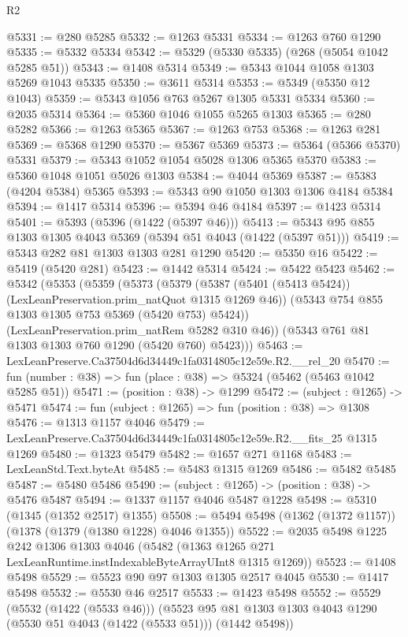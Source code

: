 \begin{lexlean}{R2}
\begin{coremodule}
@5331 := @280 @5285
@5332 := @1263 @5331
@5334 := @1263 @760 @1290
@5335 := @5332 @5334
@5342 := @5329 (@5330 @5335) (@268 (@5054 @1042 @5285 @51))
@5343 := @1408 @5314
@5349 := @5343 @1044 @1058 @1303 @5269 @1043 @5335
@5350 := @3611 @5314
@5353 := @5349 (@5350 @12 @1043)
@5359 := @5343 @1056 @763 @5267 @1305 @5331 @5334
@5360 := @2035 @5314
@5364 := @5360 @1046 @1055 @5265 @1303
@5365 := @280 @5282
@5366 := @1263 @5365
@5367 := @1263 @753
@5368 := @1263 @281
@5369 := @5368 @1290
@5370 := @5367 @5369
@5373 := @5364 (@5366 @5370) @5331
@5379 := @5343 @1052 @1054 @5028 @1306 @5365 @5370
@5383 := @5360 @1048 @1051 @5026 @1303
@5384 := @4044 @5369
@5387 := @5383 (@4204 @5384) @5365
@5393 := @5343 @90 @1050 @1303 @1306 @4184 @5384
@5394 := @1417 @5314
@5396 := @5394 @46 @4184
@5397 := @1423 @5314
@5401 := @5393 (@5396 (@1422 (@5397 @46)))
@5413 := @5343 @95 @855 @1303 @1305 @4043 @5369 (@5394 @51 @4043 (@1422 (@5397 @51)))
@5419 := @5343 @282 @81 @1303 @1303 @281 @1290
@5420 := @5350 @16
@5422 := @5419 (@5420 @281)
@5423 := @1442 @5314
@5424 := @5422 @5423
@5462 := @5342
    (@5353
      (@5359
        (@5373
          (@5379
            (@5387 (@5401 (@5413 @5424)) (LexLeanPreservation.prim_natQuot @1315 @1269 @46))
            (@5343 @754 @855 @1303 @1305 @753 @5369 (@5420 @753) @5424))
          (LexLeanPreservation.prim_natRem @5282 @310 @46))
        (@5343 @761 @81 @1303 @1303 @760 @1290 (@5420 @760) @5423)))
@5463 := LexLeanPreserve.Ca37504d6d34449c1fa0314805c12e59e.R2.__rel_20
@5470 := fun (number : @38) => fun (place : @38) => @5324 (@5462 (@5463 @1042 @5285 @51))
@5471 := (position : @38) -> @1299
@5472 := (subject : @1265) -> @5471
@5474 := fun (subject : @1265) => fun (position : @38) => @1308
@5476 := @1313 @1157 @4046
@5479 := LexLeanPreserve.Ca37504d6d34449c1fa0314805c12e59e.R2.__fits_25 @1315 @1269
@5480 := @1323 @5479
@5482 := @1657 @271 @1168
@5483 := LexLeanStd.Text.byteAt
@5485 := @5483 @1315 @1269
@5486 := @5482 @5485
@5487 := @5480 @5486
@5490 := (subject : @1265) -> (position : @38) -> @5476 @5487
@5494 := @1337 @1157 @4046 @5487 @1228
@5498 := @5310 (@1345 (@1352 @2517) @1355)
@5508 := @5494 @5498 (@1362 (@1372 @1157)) (@1378 (@1379 (@1380 @1228) @4046 @1355))
@5522 := @2035
    @5498
    @1225
    @242
    @1306
    @1303
    @4046
    (@5482 (@1363 @1265 @271 LexLeanRuntime.instIndexableByteArrayUInt8 @1315 @1269))
@5523 := @1408 @5498
@5529 := @5523 @90 @97 @1303 @1305 @2517 @4045
@5530 := @1417 @5498
@5532 := @5530 @46 @2517
@5533 := @1423 @5498
@5552 := @5529
    (@5532 (@1422 (@5533 @46)))
    (@5523 @95 @81 @1303 @1303 @4043 @1290 (@5530 @51 @4043 (@1422 (@5533 @51))) (@1442 @5498))

\end{coremodule}
\end{lexlean}

